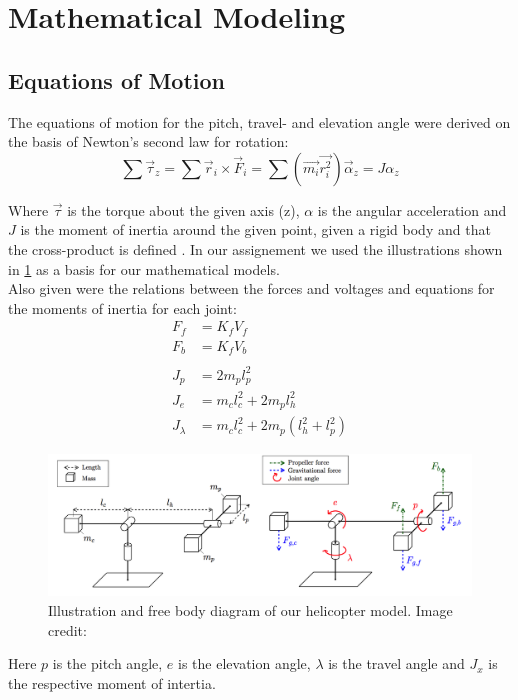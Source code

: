 \section{Mathematical Modeling}

\subsection{Equations of Motion}
The equations of motion for the pitch, travel- and elevation angle were derived on the basis of Newton's second law for rotation:
%
\begin{equation}
    \sum \vec{\tau}_{z} = \sum \vec{r}_i\times\vec{F}_i = \sum(\vec{m_i}\vec{r_i^2})\vec{\alpha}_z= J\alpha_z \label{EOR}
\end{equation}
%

%
Where $\vec{\tau}$ is the torque about the given axis (z), $\alpha$ is the angular acceleration and $J$ is the moment of inertia around the given point, given a rigid body and that the cross-product is defined \cite{uniphysics}.
In our assignement we used the illustrations shown in \cref{fig:illustrasjon} as a basis for our mathematical models.\\ Also given were the relations between the forces and voltages and equations for the moments of inertia for each joint:
%
\begin{subequations}
    \begin{align}
    F_f &= K_fV_f   \nonumber              \\
    F_b &= K_fV_b   \nonumber               \\ \nonumber \\
    J_p &= 2m_pl_p^2                           \label{eq:MOI1} \\
    J_e &= m_cl_c^2 + 2m_pl_h^2                \label{eq_MOI2}\\
    J_\lambda &= m_cl_c^2 + 2m_p(l_h^2+l_p^2)  \label{eq:MOI3}  %
    \end{align}
\end{subequations}
%
\begin{figure}[b]
    \centering
    \includegraphics[width=1.0\textwidth]{helikopter.png}
    \caption{Illustration and free body diagram of our helicopter model. Image credit: \cite{labtext}}
    \label{fig:illustrasjon}
\end{figure}
Here $p$ is the pitch angle, $e$ is the elevation angle, $\lambda$ is the travel angle and $J_x$ is the respective moment of intertia.

